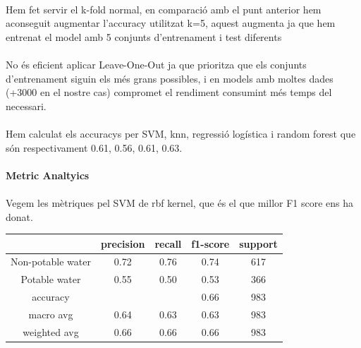 \documentclass{article}
\begin{document}
	\\
	Hem fet servir el k-fold normal, en comparació amb el punt anterior hem aconseguit augmentar l'accuracy utilitzat k=5, aquest augmenta ja que hem entrenat el model amb 5 conjunts d'entrenament i test diferents\\
	\\
	No és eficient aplicar Leave-One-Out ja que prioritza que els conjunts d'entrenament siguin els més grans possibles, i en models amb moltes dades (+3000 en el nostre cas) compromet el rendiment consumint més temps del necessari.\\
	\\
	Hem calculat els accuracys per SVM, knn, regressió logística i random forest que són respectivament 0.61, 0.56, 0.61, 0.63.\\ 
	\\
	\textbf{Metric Analtyics}\\
	\\
	Vegem les mètriques pel SVM de rbf kernel, que és el que millor F1 score ens ha donat.\\
	\begin{center}
		\begin{tabular}{|c|c|c|c|c|}\hline
			&precision  &  recall & f1-score  & support\\ \hline
			
			Non-potable water   &    0.72 &     0.76 &     0.74 &      617\\ \hline
			Potable water    &   0.55    &  0.50     & 0.53      & 366\\ \hline
			
			accuracy       &     &          &     0.66     &  983\\ \hline
			macro avg       &0.64  &    0.63   &   0.63      & 983\\ \hline
			weighted avg     &  0.66 &     0.66  &    0.66    &   983\\ \hline
		\end{tabular}
	\end{center}
	
\end{document}
